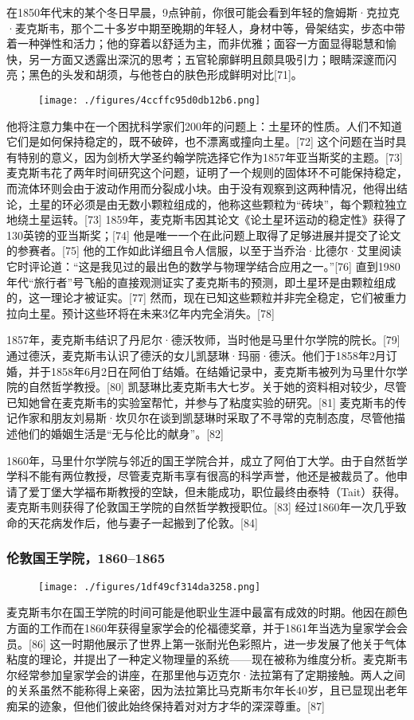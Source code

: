 在1850年代末的某个冬日早晨，9点钟前，你很可能会看到年轻的詹姆斯·克拉克·麦克斯韦，那个二十多岁中期至晚期的年轻人，身材中等，骨架结实，步态中带着一种弹性和活力；他的穿着以舒适为主，而非优雅；面容一方面显得聪慧和愉快，另一方面又透露出深沉的思考；五官轮廓鲜明且颇具吸引力；眼睛深邃而闪亮；黑色的头发和胡须，与他苍白的肤色形成鲜明对比[71]。
\begin{figure}[ht]
\centering
\texttt{[image: ./figures/4ccffc95d0db12b6.png]}
\caption{} \label{fig_Clerk_5}
\end{figure}
他将注意力集中在一个困扰科学家们200年的问题上：土星环的性质。人们不知道它们是如何保持稳定的，既不破碎，也不漂离或撞向土星。[72] 这个问题在当时具有特别的意义，因为剑桥大学圣约翰学院选择它作为1857年亚当斯奖的主题。[73] 麦克斯韦花了两年时间研究这个问题，证明了一个规则的固体环不可能保持稳定，而流体环则会由于波动作用而分裂成小块。由于没有观察到这两种情况，他得出结论，土星的环必须是由无数小颗粒组成的，他称这些颗粒为“砖块”，每个颗粒独立地绕土星运转。[73] 1859年，麦克斯韦因其论文《论土星环运动的稳定性》获得了130英镑的亚当斯奖；[74] 他是唯一一个在此问题上取得了足够进展并提交了论文的参赛者。[75] 他的工作如此详细且令人信服，以至于当乔治·比德尔·艾里阅读它时评论道：“这是我见过的最出色的数学与物理学结合应用之一。”[76] 直到1980年代“旅行者”号飞船的直接观测证实了麦克斯韦的预测，即土星环是由颗粒组成的，这一理论才被证实。[77] 然而，现在已知这些颗粒并非完全稳定，它们被重力拉向土星。预计这些环将在未来3亿年内完全消失。[78]

1857年，麦克斯韦结识了丹尼尔·德沃牧师，当时他是马里什尔学院的院长。[79] 通过德沃，麦克斯韦认识了德沃的女儿凯瑟琳·玛丽·德沃。他们于1858年2月订婚，并于1858年6月2日在阿伯丁结婚。在结婚记录中，麦克斯韦被列为马里什尔学院的自然哲学教授。[80] 凯瑟琳比麦克斯韦大七岁。关于她的资料相对较少，尽管已知她曾在麦克斯韦的实验室帮忙，并参与了粘度实验的研究。[81] 麦克斯韦的传记作家和朋友刘易斯·坎贝尔在谈到凯瑟琳时采取了不寻常的克制态度，尽管他描述他们的婚姻生活是“无与伦比的献身”。[82]

1860年，马里什尔学院与邻近的国王学院合并，成立了阿伯丁大学。由于自然哲学学科不能有两位教授，尽管麦克斯韦享有很高的科学声誉，他还是被裁员了。他申请了爱丁堡大学福布斯教授的空缺，但未能成功，职位最终由泰特（Tait）获得。麦克斯韦则获得了伦敦国王学院的自然哲学教授职位。[83] 经过1860年一次几乎致命的天花病发作后，他与妻子一起搬到了伦敦。[84]
\subsubsection{伦敦国王学院，1860–1865}
\begin{figure}[ht]
\centering
\texttt{[image: ./figures/1df49cf314da3258.png]}
\caption{} \label{fig_Clerk_4}
\end{figure}
麦克斯韦尔在国王学院的时间可能是他职业生涯中最富有成效的时期。他因在颜色方面的工作而在1860年获得皇家学会的伦福德奖章，并于1861年当选为皇家学会会员。[86] 这一时期他展示了世界上第一张耐光色彩照片，进一步发展了他关于气体粘度的理论，并提出了一种定义物理量的系统——现在被称为维度分析。麦克斯韦尔经常参加皇家学会的讲座，在那里他与迈克尔·法拉第有了定期接触。两人之间的关系虽然不能称得上亲密，因为法拉第比马克斯韦尔年长40岁，且已显现出老年痴呆的迹象，但他们彼此始终保持着对对方才华的深深尊重。[87]

